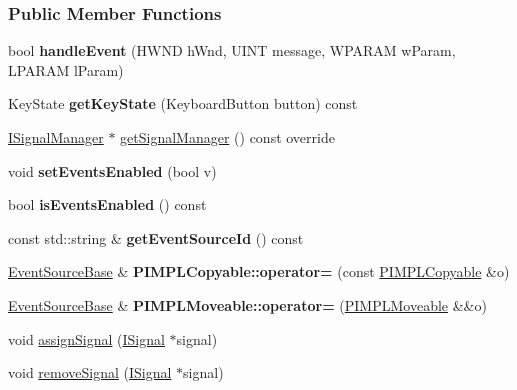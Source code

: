 \subsubsection*{Public Member Functions}
\begin{DoxyCompactItemize}
\item 
bool {\bfseries handle\+Event} (H\+W\+ND h\+Wnd, U\+I\+NT message, W\+P\+A\+R\+AM w\+Param, L\+P\+A\+R\+AM l\+Param)\hypertarget{a00056_a71dec63b611c18f3ea41c8fdebc81191}{}\label{a00056_a71dec63b611c18f3ea41c8fdebc81191}

\item 
Key\+State {\bfseries get\+Key\+State} (Keyboard\+Button button) const \hypertarget{a00055_a89fd597ce678be8a6b50a36b549a5922}{}\label{a00055_a89fd597ce678be8a6b50a36b549a5922}

\item 
\hyperlink{a00051}{I\+Signal\+Manager} $\ast$ \hyperlink{a00055_a324f41177f75c6d08ad6494c36a65806}{get\+Signal\+Manager} () const  override
\item 
void {\bfseries set\+Events\+Enabled} (bool v)\hypertarget{a00036_ae529242181c16462bef9bd6b8fb56b93}{}\label{a00036_ae529242181c16462bef9bd6b8fb56b93}

\item 
bool {\bfseries is\+Events\+Enabled} () const \hypertarget{a00036_a659325f18d666f132f380e4319499572}{}\label{a00036_a659325f18d666f132f380e4319499572}

\item 
const std\+::string \& {\bfseries get\+Event\+Source\+Id} () const \hypertarget{a00036_ad41deeb2b9de38797b10777e5d1ecf13}{}\label{a00036_ad41deeb2b9de38797b10777e5d1ecf13}

\item 
\hyperlink{a00036}{Event\+Source\+Base} \& {\bfseries P\+I\+M\+P\+L\+Copyable\+::operator=} (const \hyperlink{a00060}{P\+I\+M\+P\+L\+Copyable} \&o)\hypertarget{a00060_a26fdb9b3d449d04dc653c7ae942f452b}{}\label{a00060_a26fdb9b3d449d04dc653c7ae942f452b}

\item 
\hyperlink{a00036}{Event\+Source\+Base} \& {\bfseries P\+I\+M\+P\+L\+Moveable\+::operator=} (\hyperlink{a00061}{P\+I\+M\+P\+L\+Moveable} \&\&o)\hypertarget{a00061_ac67025e8a25edffe99fa9bf67ed8ca19}{}\label{a00061_ac67025e8a25edffe99fa9bf67ed8ca19}

\item 
void \hyperlink{a00070_afd9ce54a72b4dd397d82aff6c387d0c0}{assign\+Signal} (\hyperlink{a00050}{I\+Signal} $\ast$signal)
\item 
void \hyperlink{a00070_a5927b57f0d4fb8744dc0e8ec265e0136}{remove\+Signal} (\hyperlink{a00050}{I\+Signal} $\ast$signal)
\end{DoxyCompactItemize}
